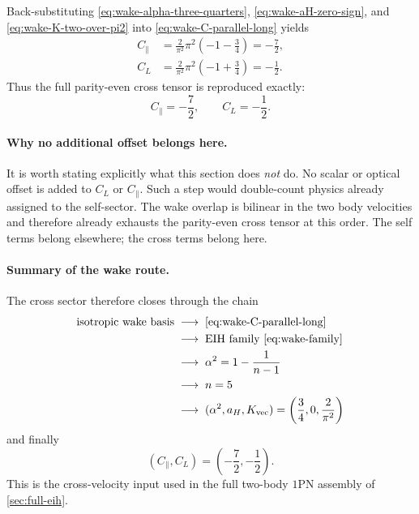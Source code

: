 \documentclass[11pt]{article}
\begin{document}
Back-substituting
\eqref{eq:wake-alpha-three-quarters}, \eqref{eq:wake-aH-zero-sign}, and
\eqref{eq:wake-K-two-over-pi2} into \eqref{eq:wake-C-parallel-long} yields
\begin{align}
C_\parallel
&=
\frac{2}{\pi^2}\pi^2\left(-1-\frac34\right)
=
-\frac72,
\label{eq:wake-backsub-para}
\\[3pt]
C_L
&=
\frac{2}{\pi^2}\pi^2\left(-1+\frac34\right)
=
-\frac12.
\label{eq:wake-backsub-long}
\end{align}
Thus the full parity-even cross tensor is reproduced exactly:
\begin{equation}
\boxed{
C_\parallel=-\frac72,
\qquad
C_L=-\frac12.
}
\label{eq:wake-final-cross}
\end{equation}

\paragraph{Why no additional offset belongs here.}
It is worth stating explicitly what this section does \emph{not} do. No scalar or optical
offset is added to \(C_L\) or \(C_\parallel\). Such a step would double-count physics
already assigned to the self-sector. The wake overlap is bilinear in the two body
velocities and therefore already exhausts the parity-even cross tensor at this order. The
self terms belong elsewhere; the cross terms belong here.

\paragraph{Summary of the wake route.}
The cross sector therefore closes through the chain
\begin{equation}
\begin{aligned}
\text{isotropic wake basis}
&\;\longrightarrow\; \eqref{eq:wake-C-parallel-long} \\
&\;\longrightarrow\; \text{EIH family } \eqref{eq:wake-family} \\
&\;\longrightarrow\; \alpha^2 = 1 - \frac{1}{n-1} \\
&\;\longrightarrow\; n = 5 \\
&\;\longrightarrow\; (\alpha^2, a_H, K_{\rm vec})
   = \left(\frac34, 0, \frac{2}{\pi^2}\right)
\end{aligned}
\label{eq:wake-route-summary}
\end{equation}
and finally
\begin{equation}
\left(C_\parallel,C_L\right)
=
\left(-\frac72,-\frac12\right).
\end{equation}
This is the cross-velocity input used in the full two-body \(1\)PN assembly of
\cref{sec:full-eih}.
\end{document}
